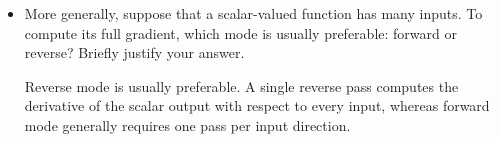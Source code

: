 \begin{itemize}
    \begin{solutionbox}{8cm}
        The input adjoints give
        \[
            \nabla_x f=(Q+Q^\top)x,
            \qquad
            \nabla_Q f=xx^\top.
        \]
        At the specified values,
        \[
            \nabla_x f=\begin{bmatrix}12\\21\end{bmatrix},
            \qquad
            \nabla_Q f=\begin{bmatrix}1&2\\2&4\end{bmatrix}.
        \]
        For every vector $v$, $(xx^\top)v=x(x^\top v)$ belongs to
        $\operatorname{span}(x)$. Thus $xx^\top$ has rank at most one, and
        its rank is exactly one when $x\ne0$.
    \end{solutionbox}

    \item More generally, suppose that a scalar-valued function has many
    inputs. To compute its full gradient, which mode is usually preferable:
    forward or reverse? Briefly justify your answer.

    \begin{solutionbox}{4cm}
        Reverse mode is usually preferable. A single reverse pass computes
        the derivative of the scalar output with respect to every input,
        whereas forward mode generally requires one pass per input direction.
    \end{solutionbox}
\end{itemize}
